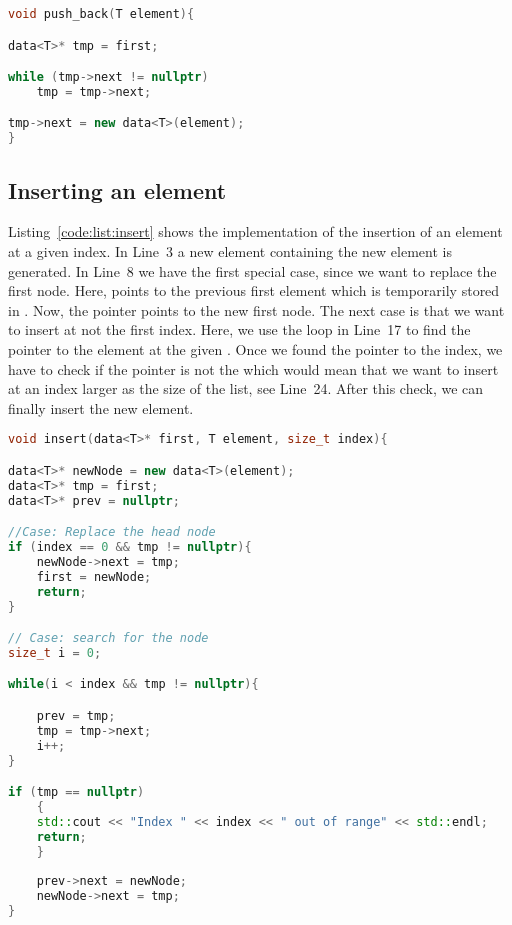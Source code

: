\begin{lstlisting}[language=c++,caption={Implementation of the \cpp{push_back} function of a linked list.\label{code:list:pus:back}},float,floatplacement=tb]
void push_back(T element){

data<T>* tmp = first;

while (tmp->next != nullptr)
    tmp = tmp->next;

tmp->next = new data<T>(element);
}
\end{lstlisting}

\subsection*{Inserting an element}
Listing~\ref{code:list:insert} shows the implementation of the insertion of an element at a given index. In Line~3 a new element  containing the new element is generated. In Line~8 we have the first special case, since we want to replace the first node. Here,  points to the previous first element which is temporarily stored in . Now, the pointer  points to the new first node. The next case is that we want to insert at not the first index. Here, we use the  loop in Line~17 to find the pointer to the element at the given . Once we found the pointer to the index, we have to check if the pointer is not the  which would mean that we want to insert at an index larger as the size of the list, see Line~24. After this check, we can finally insert the new element.

\begin{lstlisting}[language=c++,caption={Implementation of the \cpp{insert} function of a linked list.\label{code:list:insert}},float,floatplacement=tb]
void insert(data<T>* first, T element, size_t index){

data<T>* newNode = new data<T>(element);
data<T>* tmp = first;
data<T>* prev = nullptr;

//Case: Replace the head node
if (index == 0 && tmp != nullptr){
    newNode->next = tmp;
    first = newNode;
    return;
}

// Case: search for the node
size_t i = 0;

while(i < index && tmp != nullptr){

    prev = tmp;
    tmp = tmp->next;
    i++;
}

if (tmp == nullptr)
    {
    std::cout << "Index " << index << " out of range" << std::endl;
    return;
    }
    
    prev->next = newNode;    
    newNode->next = tmp;
}
\end{lstlisting}


